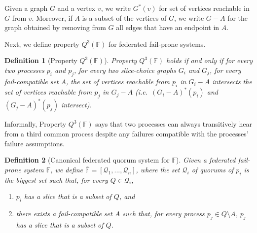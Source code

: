 \documentclass[11pt,letterpaper]{article}
\newtheorem{definition}{Definition}
\begin{document}
Given a graph $G$ and a vertex $v$, we write $G^*(v)$ for set of vertices reachable in $G$ from $v$. Moreover, if $A$ is a subset of the vertices of $G$, we write $G-A$ for the graph obtained by removing from $G$ all edges that have an endpoint in $A$.



Next, we define property $Q^3(\mathbb{F})$ for federated fail-prone systems.
\begin{definition}[Property $Q^3(\mathbb{F})$]
  Property $Q^3(\mathbb{F})$ holds if and only if for every two processes $p_i$ and $p_j$, for every two slice-choice graphs $G_i$ and $G_j$, for every fail-compatible set $A$, the set of vertices reachable from $p_i$ in $G_i-A$ intersects the set of vertices reachable from $p_j$ in $G_j-A$ (i.e.\ $\left(G_i-A\right)^*(p_i)$ and $\left(G_j-A\right)^*(p_j)$ intersect).
\end{definition}

Informally, Property $Q^3(\mathbb{F})$ says that two processes can always transitively hear from a third common process despite any failures compatible with the processes' failure assumptions.

\begin{definition}[Canonical federated quorum system for $\mathbb{F}$]
  \label{def:canonical}
  Given a federated fail-prone system $\mathbb{F}$, we define $\overline{\mathbb{F}}=\left[\mathcal{Q}_1,...,\mathcal{Q}_n\right]$, where the set $\mathcal{Q}_i$ of quorums of $p_i$ is the biggest set such that, for every $Q\in\mathcal{Q}_i$,
  \begin{enumerate}
    \item $p_i$ has a slice that is a subset of $Q$, and
    \item there exists a fail-compatible set $A$ such that, for every process $p_j\in Q\setminus A$, $p_j$ has a slice that is a subset of $Q$.
  \end{enumerate}
\end{definition}
\end{document}
